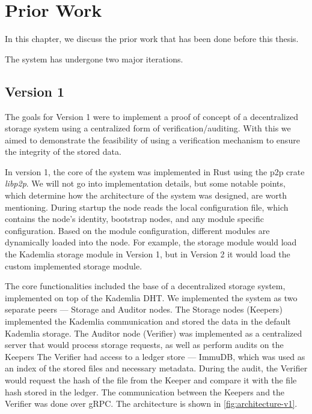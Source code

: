\chapter{Prior Work}
\label{cha:prior-work}

In this chapter, we discuss the prior work that has been done before this thesis.

The system has undergone two major iterations.

\section{Version 1}

The goals for Version 1 were to implement a proof of concept of a decentralized storage system
using a centralized form of verification/auditing.
With this we aimed to demonstrate the feasibility of using a verification mechanism to
ensure the integrity of the stored data.

In version 1, the core of the system was implemented in Rust using the
p2p crate \textit{libp2p}.
We will not go into implementation details, but some notable points, which determine how the architecture
of the system was designed, are worth mentioning.
During startup the node reads the local configuration file, which contains the node's identity,
bootstrap nodes, and any module specific configuration.
Based on the module configuration, different modules are dynamically loaded into the node.
For example, the storage module would load the Kademlia storage module in Version 1,
but in Version 2 it would load the custom implemented storage module.

The core functionalities included the base of a decentralized storage system,
implemented on top of the Kademlia DHT.
We implemented the system as two separate peers --- Storage and Auditor nodes.
The Storage nodes (Keepers) implemented the Kademlia communication and stored the data in the
default Kademlia storage.
The Auditor node (Verifier) was implemented as a centralized server that would process storage requests,
as well as perform audits on the Keepers
The Verifier had access to a ledger store --- ImmuDB,
which was used as an index of the stored files and necessary metadata.
During the audit, the Verifier would request the hash of the file from the Keeper
and compare it with the file hash stored in the ledger.
The communication between the Keepers and the Verifier was done over gRPC.
The architecture is shown in \autoref{fig:architecture-v1}.

